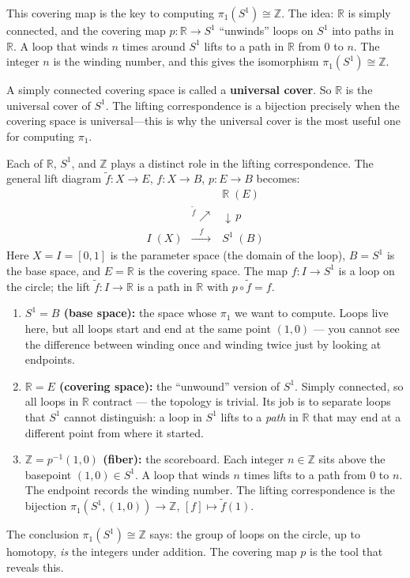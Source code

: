 \documentclass[11pt]{report}
\begin{document}
\begin{rembox}
This covering map is the key to computing $\pi_1(S^1) \cong \mathbb{Z}$. The idea: $\mathbb{R}$ is simply connected, and the covering map $p: \mathbb{R} \to S^1$ ``unwinds'' loops on $S^1$ into paths in $\mathbb{R}$. A loop that winds $n$ times around $S^1$ lifts to a path in $\mathbb{R}$ from $0$ to $n$. The integer $n$ is the winding number, and this gives the isomorphism $\pi_1(S^1) \cong \mathbb{Z}$.

A simply connected covering space is called a \textbf{universal cover}. So $\mathbb{R}$ is the universal cover of $S^1$. The lifting correspondence is a bijection precisely when the covering space is universal---this is why the universal cover is the most useful one for computing $\pi_1$.
\end{rembox}

\begin{rembox}
Each of $\mathbb{R}$, $S^1$, and $\mathbb{Z}$ plays a distinct role in the lifting correspondence. The general lift diagram $\tilde{f}: X \to E$, $f: X \to B$, $p: E \to B$ becomes:
\[\begin{array}{ccc}
& & \mathbb{R} \; (E) \\
& {}^{\tilde{f}}\nearrow & \downarrow \, p \\
I \; (X) & \xrightarrow{\quad f \quad} & S^1 \; (B)
\end{array}\]
Here $X = I = [0,1]$ is the parameter space (the domain of the loop), $B = S^1$ is the base space, and $E = \mathbb{R}$ is the covering space. The map $f: I \to S^1$ is a loop on the circle; the lift $\tilde{f}: I \to \mathbb{R}$ is a path in $\mathbb{R}$ with $p \circ \tilde{f} = f$.

\begin{enumerate}[nosep]
    \item \textbf{$S^1 = B$ (base space):} the space whose $\pi_1$ we want to compute. Loops live here, but all loops start and end at the same point $(1,0)$ --- you cannot see the difference between winding once and winding twice just by looking at endpoints.
    \item \textbf{$\mathbb{R} = E$ (covering space):} the ``unwound'' version of $S^1$. Simply connected, so all loops in $\mathbb{R}$ contract --- the topology is trivial. Its job is to separate loops that $S^1$ cannot distinguish: a loop in $S^1$ lifts to a \emph{path} in $\mathbb{R}$ that may end at a different point from where it started.
    \item \textbf{$\mathbb{Z} = p^{-1}(1,0)$ (fiber):} the scoreboard. Each integer $n \in \mathbb{Z}$ sits above the basepoint $(1,0) \in S^1$. A loop that winds $n$ times lifts to a path from $0$ to $n$. The endpoint records the winding number. The lifting correspondence is the bijection $\pi_1(S^1, (1,0)) \to \mathbb{Z}$, $[f] \mapsto \tilde{f}(1)$.
\end{enumerate}
The conclusion $\pi_1(S^1) \cong \mathbb{Z}$ says: the group of loops on the circle, up to homotopy, \emph{is} the integers under addition. The covering map $p$ is the tool that reveals this.
\end{rembox}
\end{document}
